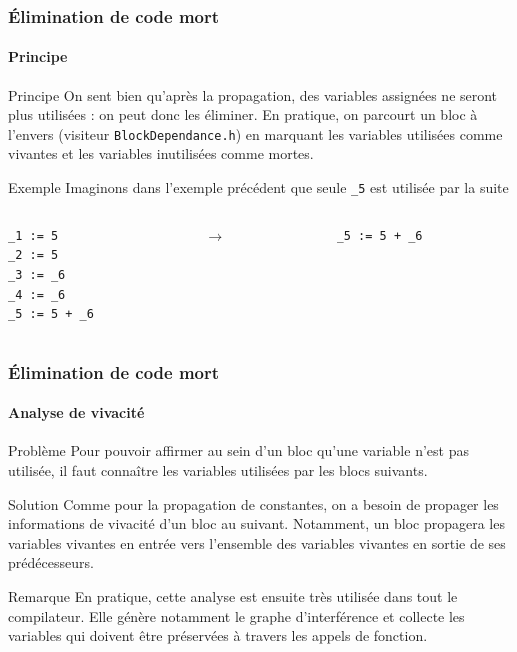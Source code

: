 \documentclass{beamer}
\begin{document}
\begin{frame}[fragile]
    \frametitle{Élimination de code mort}
    \framesubtitle{Principe}
    
    \begin{block}{Principe}
        On sent bien qu'après la propagation, des variables assignées ne seront plus
        utilisées : on peut donc les éliminer. En pratique, on parcourt un bloc
        à l'envers (visiteur \lstinline{BlockDependance.h}) en marquant les variables 
        utilisées comme vivantes et les variables inutilisées comme mortes.

    \end{block}
    \pause
    \begin{exampleblock}{Exemple}
        Imaginons dans l'exemple précédent que seule \lstinline{_5} est utilisée par la suite
         \begin{columns}
            \begin{column}{.40\textwidth}
                    \begin{lstlisting}
_1 := 5
_2 := 5
_3 := _6
_4 := _6
_5 := 5 + _6
                    \end{lstlisting}
            \end{column}
            \pause
            \begin{column}{.04\textwidth}
                $\rightarrow$
            \end{column}
            \begin{column}{.40\textwidth}
                    \begin{lstlisting}
_5 := 5 + _6

                    \end{lstlisting}
            \end{column}
        \end{columns}       
    \end{exampleblock}
\end{frame}

\begin{frame}
    \frametitle{Élimination de code mort}
    \framesubtitle{Analyse de vivacité}
    \begin{alertblock}{Problème}
        Pour pouvoir affirmer au sein d'un bloc qu'une variable n'est pas utilisée,
        il faut connaître les variables utilisées par les blocs suivants. 
    \end{alertblock}
    \pause
    \begin{block}{Solution}
        Comme pour la propagation de constantes, on a besoin de propager les informations
        de vivacité d'un bloc au suivant. Notamment, un bloc propagera les variables
        vivantes en entrée vers l'ensemble des variables vivantes en sortie de ses
        prédécesseurs.
    \end{block}
    \pause
    \begin{block}{Remarque}
        En pratique, cette analyse est ensuite très utilisée dans tout le compilateur.
        Elle génère notamment le graphe d'interférence et collecte les variables qui doivent
        être préservées à travers les appels de fonction.
    \end{block}
\end{frame}
\end{document}
